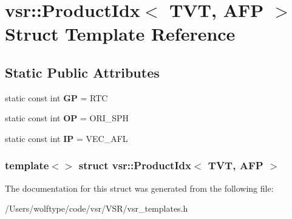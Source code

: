 \hypertarget{structvsr_1_1_product_idx_3_01_t_v_t_00_01_a_f_p_01_4}{\section{vsr\-:\-:Product\-Idx$<$ T\-V\-T, A\-F\-P $>$ Struct Template Reference}
\label{structvsr_1_1_product_idx_3_01_t_v_t_00_01_a_f_p_01_4}
}
\subsection*{Static Public Attributes}
\begin{DoxyCompactItemize}
\item 
\hypertarget{structvsr_1_1_product_idx_3_01_t_v_t_00_01_a_f_p_01_4_ab87842f7e4575bbee24546eb5d5db755}{static const int {\bfseries G\-P} = R\-T\-C}\label{structvsr_1_1_product_idx_3_01_t_v_t_00_01_a_f_p_01_4_ab87842f7e4575bbee24546eb5d5db755}

\item 
\hypertarget{structvsr_1_1_product_idx_3_01_t_v_t_00_01_a_f_p_01_4_a7864dedd1a9d1c3402de082f34b67fd2}{static const int {\bfseries O\-P} = O\-R\-I\-\_\-\-S\-P\-H}\label{structvsr_1_1_product_idx_3_01_t_v_t_00_01_a_f_p_01_4_a7864dedd1a9d1c3402de082f34b67fd2}

\item 
\hypertarget{structvsr_1_1_product_idx_3_01_t_v_t_00_01_a_f_p_01_4_adc6c8fc8deab56477d4a8da24d3aaa6d}{static const int {\bfseries I\-P} = V\-E\-C\-\_\-\-A\-F\-L}\label{structvsr_1_1_product_idx_3_01_t_v_t_00_01_a_f_p_01_4_adc6c8fc8deab56477d4a8da24d3aaa6d}

\end{DoxyCompactItemize}
\subsubsection*{template$<$$>$ struct vsr\-::\-Product\-Idx$<$ T\-V\-T, A\-F\-P $>$}



The documentation for this struct was generated from the following file\-:\begin{DoxyCompactItemize}
\item 
/\-Users/wolftype/code/vsr/\-V\-S\-R/vsr\-\_\-templates.\-h\end{DoxyCompactItemize}
